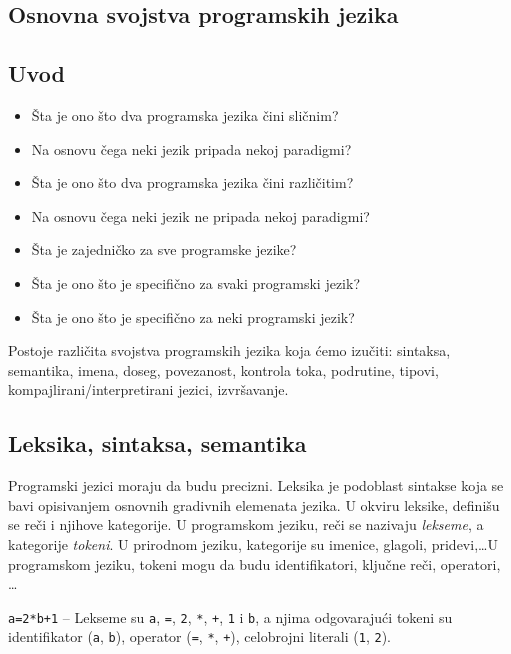 \documentclass[../main.tex]{subfiles}
\begin{document}
\pagebreak
\begin{boxnaslovi}
\section{Osnovna svojstva programskih jezika}
\end{boxnaslovi}

\subsection{Uvod}

\begin{itemize}
\item Šta je ono što dva programska jezika čini sličnim?
\item Na osnovu čega neki jezik pripada nekoj paradigmi?
\item Šta je ono što dva programska jezika čini različitim?
\item Na osnovu čega neki jezik ne pripada nekoj paradigmi?
\item Šta je zajedničko za sve programske jezike?
\item Šta je ono što je specifično za svaki programski jezik?
\item Šta je ono što je specifično za neki programski jezik?
\end{itemize}
Postoje različita svojstva programskih jezika koja ćemo izučiti: sintaksa, semantika, imena, doseg, povezanost, kontrola toka, podrutine, tipovi, kompajlirani/interpretirani jezici, izvršavanje.

\subsection{Leksika, sintaksa, semantika}
Programski jezici moraju da budu precizni. Leksika je podoblast sintakse koja se bavi opisivanjem osnovnih gradivnih elemenata jezika. U okviru leksike, definišu se reči i njihove kategorije. U programskom jeziku, reči se nazivaju {\it lekseme}, a kategorije {\it tokeni}. U prirodnom jeziku, kategorije su imenice, glagoli, pridevi,\ldots  U programskom jeziku, tokeni mogu da budu identifikatori, ključne reči, operatori, \ldots

\begin{boxprimer}
\texttt{a=2*b+1} -- Lekseme su \texttt{a}, \texttt{=}, \texttt{2}, \texttt{*}, \texttt{+}, \texttt{1} i \texttt{b}, a njima odgovarajući tokeni su identifikator (\texttt{a}, \texttt{b}), operator (\texttt{=}, \texttt{*}, \texttt{+}), celobrojni literali (\texttt{1}, \texttt{2}). 
\end{boxprimer}
\end{document}
